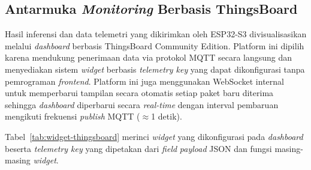 \subsection{Antarmuka \textit{Monitoring} Berbasis ThingsBoard}

Hasil inferensi dan data telemetri yang dikirimkan oleh ESP32-S3
divisualisasikan melalui \textit{dashboard} berbasis ThingsBoard
Community Edition. Platform ini dipilih karena mendukung penerimaan
data via protokol MQTT secara langsung dan menyediakan sistem \textit{widget}
berbasis \textit{telemetry key} yang dapat dikonfigurasi tanpa
pemrograman \textit{frontend}. Platform ini juga menggunakan WebSocket internal
untuk memperbarui tampilan secara otomatis setiap paket baru diterima
sehingga \textit{dashboard} diperbarui secara \textit{real-time} dengan
interval pembaruan mengikuti frekuensi \textit{publish} MQTT ($\approx$1 detik).

Tabel~\ref{tab:widget-thingsboard} merinci \textit{widget} yang dikonfigurasi
pada \textit{dashboard} beserta \textit{telemetry key} yang dipetakan
dari \textit{field} \textit{payload} JSON dan fungsi masing-masing \textit{widget}.

